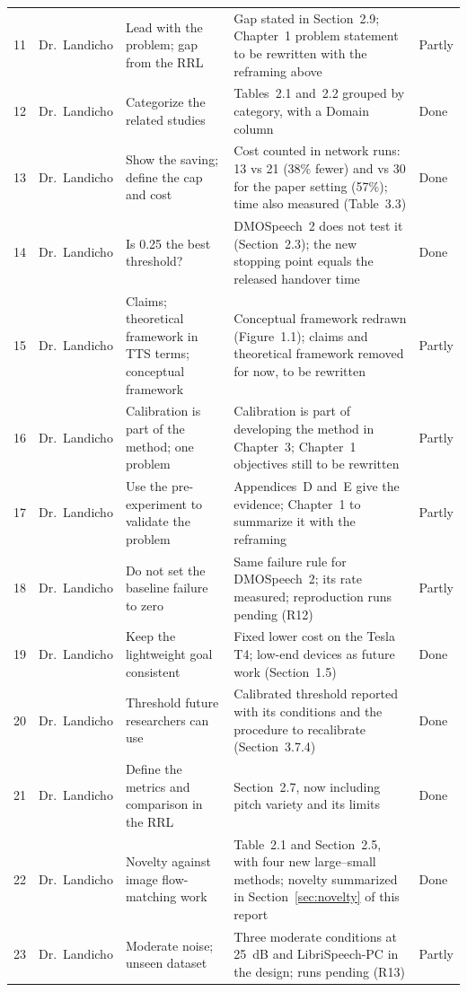 \documentclass[11pt,a4paper]{article}
\begin{document}
{\begin{longtable}{@{}P{0.65cm} P{1.95cm} P{3.9cm} P{6.4cm} P{1.3cm}@{}}
11 & Dr.~Landicho & Lead with the problem; gap from the RRL & Gap stated in Section~2.9; Chapter~1 problem statement to be rewritten with the reframing above & Partly \\
12 & Dr.~Landicho & Categorize the related studies & Tables~2.1 and~2.2 grouped by category, with a Domain column & Done \\
13 & Dr.~Landicho & Show the saving; define the cap and cost & Cost counted in network runs: 13 vs 21 (38\% fewer) and vs 30 for the paper setting (57\%); time also measured (Table~3.3) & Done \\
14 & Dr.~Landicho & Is 0.25 the best threshold? & DMOSpeech~2 does not test it (Section~2.3); the new stopping point equals the released handover time & Done \\
15 & Dr.~Landicho & Claims; theoretical framework in TTS terms; conceptual framework & Conceptual framework redrawn (Figure~1.1); claims and theoretical framework removed for now, to be rewritten & Partly \\
16 & Dr.~Landicho & Calibration is part of the method; one problem & Calibration is part of developing the method in Chapter~3; Chapter~1 objectives still to be rewritten & Partly \\
17 & Dr.~Landicho & Use the pre-experiment to validate the problem & Appendices~D and~E give the evidence; Chapter~1 to summarize it with the reframing & Partly \\
18 & Dr.~Landicho & Do not set the baseline failure to zero & Same failure rule for DMOSpeech~2; its rate measured; reproduction runs pending (R12) & Partly \\
19 & Dr.~Landicho & Keep the lightweight goal consistent & Fixed lower cost on the Tesla T4; low-end devices as future work (Section~1.5) & Done \\
20 & Dr.~Landicho & Threshold future researchers can use & Calibrated threshold reported with its conditions and the procedure to recalibrate (Section~3.7.4) & Done \\
21 & Dr.~Landicho & Define the metrics and comparison in the RRL & Section~2.7, now including pitch variety and its limits & Done \\
22 & Dr.~Landicho & Novelty against image flow-matching work & Table~2.1 and Section~2.5, with four new large--small methods; novelty summarized in Section~\ref{sec:novelty} of this report & Done \\
23 & Dr.~Landicho & Moderate noise; unseen dataset & Three moderate conditions at 25~dB and LibriSpeech-PC in the design; runs pending (R13) & Partly \\

\end{longtable}}
\end{document}
